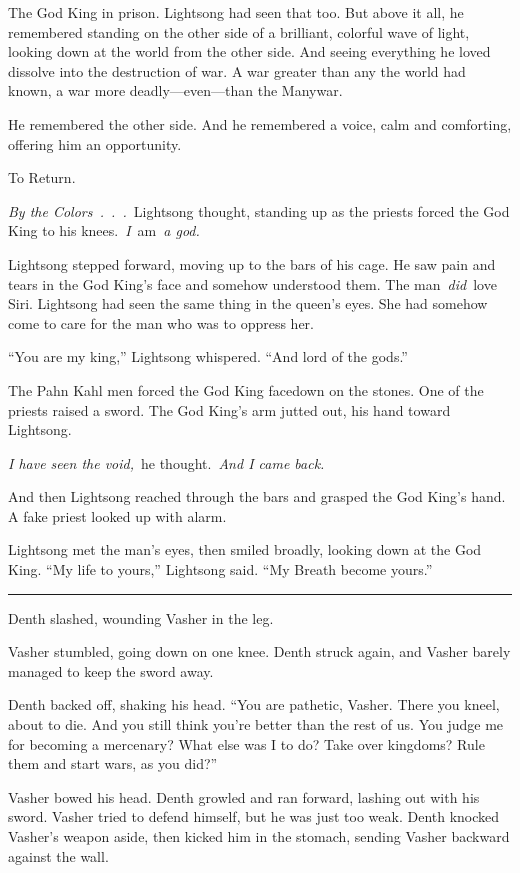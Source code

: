 The God King in prison. Lightsong had seen that too. But above it all, he remembered standing on the other side of a brilliant, colorful wave of light, looking down at the world from the other side. And seeing everything he loved dissolve into the destruction of war. A war greater than any the world had known, a war more deadly—even—than the Manywar.

He remembered the other side. And he remembered a voice, calm and comforting, offering him an opportunity.

To Return.

\textit{By the Colors~.~.~.}~Lightsong thought, standing up as the priests forced the God King to his knees.~\textit{I}~am~\textit{a god.}

Lightsong stepped forward, moving up to the bars of his cage. He saw pain and tears in the God King’s face and somehow understood them. The man~\textit{did}~love Siri. Lightsong had seen the same thing in the queen’s eyes. She had somehow come to care for the man who was to oppress her.

“You are my king,” Lightsong whispered. “And lord of the gods.”

The Pahn Kahl men forced the God King facedown on the stones. One of the priests raised a sword. The God King’s arm jutted out, his hand toward Lightsong.

\textit{I have seen the void,}~he thought.~\textit{And I came back.}

And then Lightsong reached through the bars and grasped the God King’s hand. A fake priest looked up with alarm.

Lightsong met the man’s eyes, then smiled broadly, looking down at the God King. “My life to yours,” Lightsong said. “My Breath become yours.”

\bigskip \hrule \bigskip

Denth slashed, wounding Vasher in the leg.

Vasher stumbled, going down on one knee. Denth struck again, and Vasher barely managed to keep the sword away.

Denth backed off, shaking his head. “You are pathetic, Vasher. There you kneel, about to die. And you still think you’re better than the rest of us. You judge me for becoming a mercenary? What else was I to do? Take over kingdoms? Rule them and start wars, as you did?”

Vasher bowed his head. Denth growled and ran forward, lashing out with his sword. Vasher tried to defend himself, but he was just too weak. Denth knocked Vasher’s weapon aside, then kicked him in the stomach, sending Vasher backward against the wall.

